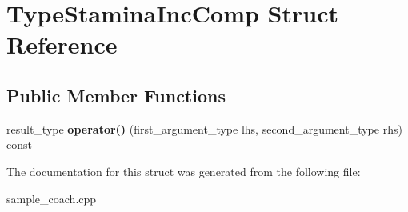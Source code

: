 \hypertarget{structTypeStaminaIncComp}{
\section{TypeStaminaIncComp Struct Reference}
\label{structTypeStaminaIncComp}
}
\subsection*{Public Member Functions}
\begin{DoxyCompactItemize}
\item 
\hypertarget{structTypeStaminaIncComp_a9530841ac2efac7515e902eaa0784379}{
result\_\-type {\bfseries operator()} (first\_\-argument\_\-type lhs, second\_\-argument\_\-type rhs) const }
\label{structTypeStaminaIncComp_a9530841ac2efac7515e902eaa0784379}

\end{DoxyCompactItemize}


The documentation for this struct was generated from the following file:\begin{DoxyCompactItemize}
\item 
sample\_\-coach.cpp\end{DoxyCompactItemize}
